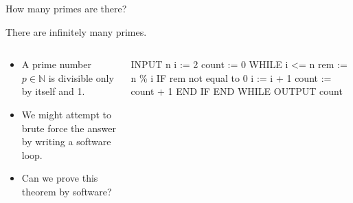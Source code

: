 \documentclass[,aspectratio=169]{beamer}
\newenvironment{Shaded}{\begin{snugshade}}{\end{snugshade}}
\newcommand{\NormalTok}[1]{#1}
\newcommand{\bbN}{\mathbb{N}}
\begin{document}
\begin{frame}[fragile,t]{How many primes are there?}
\protect\hypertarget{how-many-primes-are-there}{}
\begin{theorem}
There are infinitely many primes.
\end{theorem}

\begin{columns}[T]
\begin{column}{0.48\textwidth}
\begin{itemize}
\item
  A prime number \(p\in\bbN\) is divisible only by itself and 1.
\item
  We might attempt to brute force the answer by writing a software loop.
\item
  Can we prove this theorem by software?
\end{itemize}
\end{column}

\begin{column}{0.48\textwidth}
\vspace{-1em}

\begin{Shaded}
\begin{Highlighting}[]
\NormalTok{INPUT n}
\NormalTok{  i := 2}
\NormalTok{  count := 0}
\NormalTok{  WHILE i \textless{}= n}
\NormalTok{    rem := n \% i}
\NormalTok{    IF rem not equal to 0}
\NormalTok{      i := i + 1}
\NormalTok{      count := count + 1}
\NormalTok{    END IF}
\NormalTok{  END WHILE}
\NormalTok{OUTPUT count}
\end{Highlighting}
\end{Shaded}
\end{column}
\end{columns}
\end{frame}
\end{document}
